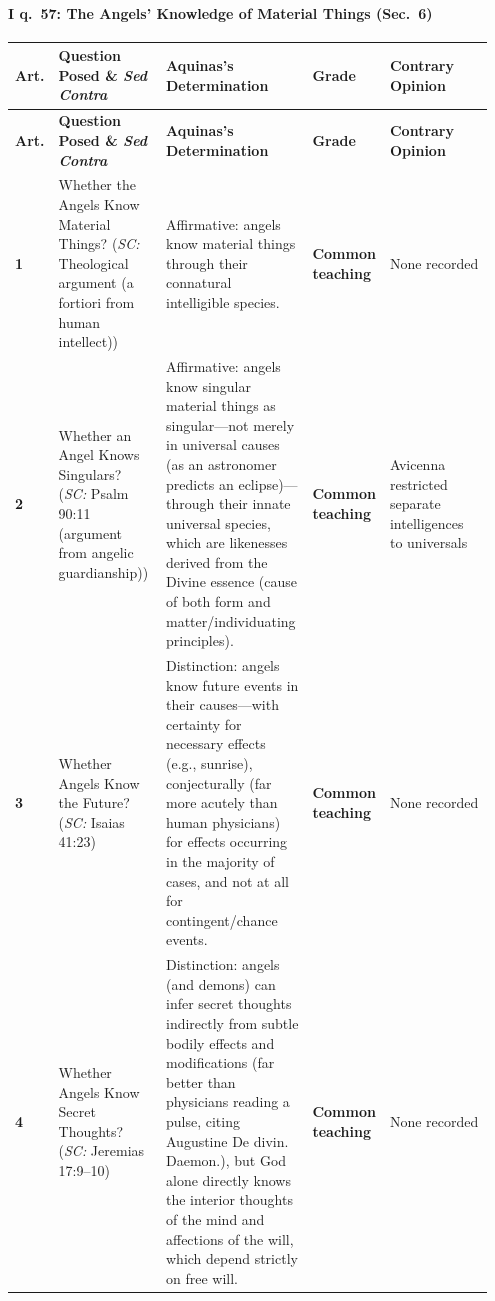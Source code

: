 \paragraph{I q.~57: The Angels' Knowledge of Material Things (Sec.~6)}
{\scriptsize
\setlength{\tabcolsep}{2.5pt}
\renewcommand{\arraystretch}{1.15}
\begin{longtable}{>{\raggedright\arraybackslash}p{0.05\linewidth}>{\raggedright\arraybackslash}p{0.23\linewidth}>{\raggedright\arraybackslash}p{0.31\linewidth}>{\raggedright\arraybackslash}p{0.12\linewidth}>{\raggedright\arraybackslash}p{0.24\linewidth}}
\toprule
\textbf{Art.} & \textbf{Question Posed \& \emph{Sed Contra}} & \textbf{Aquinas's Determination} & \textbf{Grade} & \textbf{Contrary Opinion} \\
\midrule
\endfirsthead
\toprule
\textbf{Art.} & \textbf{Question Posed \& \emph{Sed Contra}} & \textbf{Aquinas's Determination} & \textbf{Grade} & \textbf{Contrary Opinion} \\
\midrule
\endhead
\bottomrule
\endfoot
\textbf{1} & Whether the Angels Know Material Things? (\emph{SC:} Theological argument (a fortiori from human intellect)) & Affirmative: angels know material things through their connatural intelligible species. & \textbf{Common teaching} & None recorded \\
\addlinespace[1.5pt]
\textbf{2} & Whether an Angel Knows Singulars? (\emph{SC:} Psalm 90:11 (argument from angelic guardianship)) & Affirmative: angels know singular material things as singular---not merely in universal causes (as an astronomer predicts an eclipse)---through their innate universal species, which are likenesses derived from the Divine essence (cause of both form and matter/individuating principles). & \textbf{Common teaching} & Avicenna restricted separate intelligences to universals \\
\addlinespace[1.5pt]
\textbf{3} & Whether Angels Know the Future? (\emph{SC:} Isaias 41:23) & Distinction: angels know future events in their causes---with certainty for necessary effects (e.g., sunrise), conjecturally (far more acutely than human physicians) for effects occurring in the majority of cases, and not at all for contingent/chance events. & \textbf{Common teaching} & None recorded \\
\addlinespace[1.5pt]
\textbf{4} & Whether Angels Know Secret Thoughts? (\emph{SC:} Jeremias 17:9--10) & Distinction: angels (and demons) can infer secret thoughts indirectly from subtle bodily effects and modifications (far better than physicians reading a pulse, citing Augustine De divin. Daemon.), but God alone directly knows the interior thoughts of the mind and affections of the will, which depend strictly on free will. & \textbf{Common teaching} & None recorded \\

\end{longtable}}
